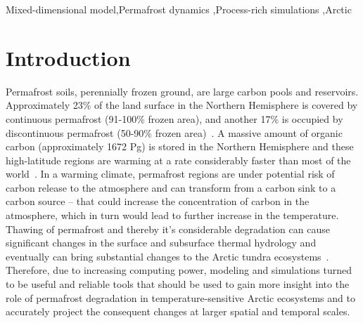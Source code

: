 \documentclass[review]{elsarticle}
\begin{document}
\begin{frontmatter}
\begin{keyword}
Mixed-dimensional model\sep Permafrost dynamics  \sep Process-rich simulations \sep Arctic 
\end{keyword}
\end{frontmatter}

\linenumbers

\section{Introduction}

Permafrost soils, perennially frozen ground, are large carbon pools and reservoirs. Approximately 23\% of the land surface in the Northern Hemisphere is covered by continuous permafrost (91-100\% frozen area), and another 17\% is occupied by discontinuous permafrost (50-90\% frozen area)~\cite{brown1997circum,jorgenson2001permafrost}. A massive amount of organic carbon (approximately 1672 Pg) is stored in the Northern Hemisphere and these high-latitude regions are warming at a rate considerably faster than most of the world~\cite{tarnocai2009soil, turner2007arctic, hansen1999giss, assessment2004impacts}. In a warming climate, permafrost regions are under potential risk of carbon release to the atmosphere and can transform from a carbon sink to a carbon source -- that could increase the concentration of carbon in the atmosphere, which in turn would lead to further increase in the temperature. Thawing of permafrost and thereby it's considerable degradation can cause significant changes in the surface and subsurface thermal hydrology and eventually can bring substantial changes to the Arctic tundra ecosystems~\cite{osterkamp1983response, walvoord2007increased, lyon2009estimation, pachauri2014climate,koven2013analysis}. Therefore, due to increasing computing power, modeling and simulations turned to be useful and reliable tools that should be used to gain more insight into the role of permafrost degradation in temperature-sensitive Arctic ecosystems and to accurately project the consequent changes at larger spatial and temporal scales.
\end{document}
